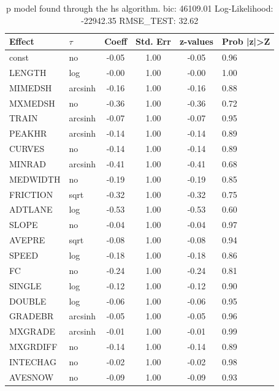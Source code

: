 \begin{table}
	\caption{p model found through the hs algorithm. bic: 46109.01 Log-Likelihood: -22942.35 RMSE_TEST: 32.62}
	\begin{center}
		\begin{tabular}{|l|l|c|c|c|l|}
			\hline
			Effect & $\tau$ & Coeff & Std. Err & z-values & Prob |z|>Z \\
			\hline
			const & no & -0.05 & 1.00 & -0.05 & 0.96 \\
			\hline
			LENGTH & log & -0.00 & 1.00 & -0.00 & 1.00 \\
			\hline
			MIMEDSH & arcsinh & -0.16 & 1.00 & -0.16 & 0.88 \\
			\hline
			MXMEDSH & no & -0.36 & 1.00 & -0.36 & 0.72 \\
			\hline
			TRAIN & arcsinh & -0.07 & 1.00 & -0.07 & 0.95 \\
			\hline
			PEAKHR & arcsinh & -0.14 & 1.00 & -0.14 & 0.89 \\
			\hline
			CURVES & no & -0.14 & 1.00 & -0.14 & 0.89 \\
			\hline
			MINRAD & arcsinh & -0.41 & 1.00 & -0.41 & 0.68 \\
			\hline
			MEDWIDTH & no & -0.19 & 1.00 & -0.19 & 0.85 \\
			\hline
			FRICTION & sqrt & -0.32 & 1.00 & -0.32 & 0.75 \\
			\hline
			ADTLANE & log & -0.53 & 1.00 & -0.53 & 0.60 \\
			\hline
			SLOPE & no & -0.04 & 1.00 & -0.04 & 0.97 \\
			\hline
			AVEPRE & sqrt & -0.08 & 1.00 & -0.08 & 0.94 \\
			\hline
			SPEED & log & -0.18 & 1.00 & -0.18 & 0.86 \\
			\hline
			FC & no & -0.24 & 1.00 & -0.24 & 0.81 \\
			\hline
			SINGLE & log & -0.12 & 1.00 & -0.12 & 0.90 \\
			\hline
			DOUBLE & log & -0.06 & 1.00 & -0.06 & 0.95 \\
			\hline
			GRADEBR & arcsinh & -0.05 & 1.00 & -0.05 & 0.96 \\
			\hline
			MXGRADE & arcsinh & -0.01 & 1.00 & -0.01 & 0.99 \\
			\hline
			MXGRDIFF & no & -0.14 & 1.00 & -0.14 & 0.89 \\
			\hline
			INTECHAG & no & -0.02 & 1.00 & -0.02 & 0.98 \\
			\hline
			AVESNOW & no & -0.09 & 1.00 & -0.09 & 0.93 \\

\end{tabular}
\end{center}
\end{table}
